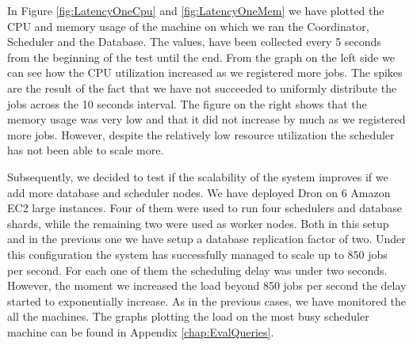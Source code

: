 \documentclass[11pt,a4paper,twoside]{report}
\begin{document}
In Figure \ref{fig:LatencyOneCpu} and \ref{fig:LatencyOneMem} we have plotted the CPU and memory usage of the machine on which we ran the Coordinator, Scheduler and the Database. The values, have been collected every 5 seconds from the beginning of the test until the end. From the graph on the left side we can see how the CPU utilization increased as we registered more jobs. The spikes are the result of the fact that we have not succeeded to uniformly distribute the jobs across the 10 seconds interval. The figure on the right shows that the memory usage was very low and that it did not increase by much as we registered more jobs. However, despite the relatively low resource utilization the scheduler has not been able to scale more.


Subsequently, we decided to test if the scalability of the system improves if we add more database and scheduler nodes. We have deployed Dron on 6 Amazon EC2 large instances. Four of them were used to run four schedulers and database shards, while the remaining two were used as worker nodes. Both in this setup and in the previous one we have setup a database replication factor of two. Under this configuration the system has successfully managed to scale up to 850 jobs per second. For each one of them the scheduling delay was under two seconds. However, the moment we increased the load beyond 850 jobs per second the delay started to exponentially increase. As in the previous cases, we have monitored the all the machines. The graphs plotting the load on the most busy scheduler machine can be found in Appendix \ref{chap:EvalQueries}.
\end{document}
